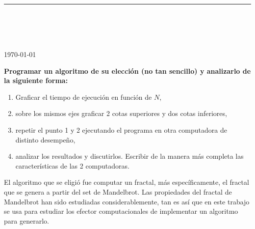 

\newcommand{\diannao}{\texttt{diannao}}
\newcommand{\hongdiannao}{\texttt{hongdiannao}}



\thispagestyle{empty}

\begin{center}
\textsc{\theinstitution}\\[2mm]

\thedepartment

\rule{0.6\textwidth}{0.5pt}\\[2mm]

\thecourse \\[4mm]

{\Large \textbf{\thetitle}}\\[2mm]

\theauthor \\[2mm]

{\small \today}
\end{center}
\medskip

\vspace{1cm}

\textbf{%
Programar un algoritmo de su elección (no tan sencillo) y analizarlo de la siguiente forma:}
\begin{enumerate}
    \item Graficar el tiempo de ejecución en función de $N$,
    \item sobre los mismos ejes graficar 2 cotas superiores y dos cotas inferiores,
    \item repetir el punto 1 y 2 ejecutando el programa en otra computadora de distinto desempeño,
    \item analizar los resultados y discutirlos. Escribir de la manera más completa las características de las 2 computadoras.
\end{enumerate}

\vspace{1cm}

El algoritmo que se eligió fue computar un fractal, más específicamente, el fractal que se genera a partir del set de Mandelbrot. Las propiedades del fractal de Mandelbrot han sido estudiadas considerablemente, tan es así que en este trabajo se usa para estudiar los efector computacionales de implementar un algoritmo para generarlo.

